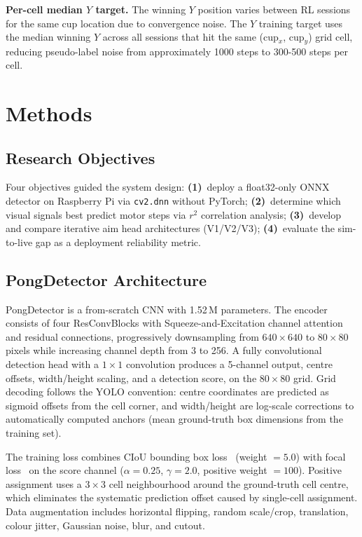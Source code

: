 \documentclass[conference]{IEEEtran}
\begin{document}
\textbf{Per-cell median $Y$ target.}  The winning $Y$ position varies between
RL sessions for the same cup location due to convergence noise.  The $Y$
training target uses the median winning $Y$ across all sessions that hit the
same (cup$_x$, cup$_y$) grid cell, reducing pseudo-label noise from
approximately 1000 steps to 300-500 steps per cell.

\section{Methods}
\label{sec:methods}

\subsection{Research Objectives}

Four objectives guided the system design: \textbf{(1)}~deploy a float32-only
ONNX detector on Raspberry Pi via \texttt{cv2.dnn} without PyTorch;
\textbf{(2)}~determine which visual signals best predict motor steps via $r^{2}$
correlation analysis; \textbf{(3)}~develop and compare iterative aim head
architectures (V1/V2/V3); \textbf{(4)}~evaluate the sim-to-live gap as a
deployment reliability metric.

\subsection{PongDetector Architecture}

PongDetector is a from-scratch CNN with 1.52\,M parameters.  The encoder
consists of four ResConvBlocks with Squeeze-and-Excitation channel attention
and residual connections, progressively downsampling from $640{\times}640$ to
$80{\times}80$ pixels while increasing channel depth from 3 to 256.  A fully
convolutional detection head with a $1{\times}1$ convolution produces a
5-channel output, centre offsets, width/height scaling, and a detection score,
on the $80{\times}80$ grid.  Grid decoding follows the YOLO convention: centre
coordinates are predicted as sigmoid offsets from the cell corner, and
width/height are log-scale corrections to automatically computed anchors (mean
ground-truth box dimensions from the training set).

The training loss combines CIoU bounding box loss~\cite{zheng2020} (weight
$=5.0$) with focal loss~\cite{lin2017} on the score channel ($\alpha=0.25$,
$\gamma=2.0$, positive weight $=100$).  Positive assignment uses a $3{\times}3$
cell neighbourhood around the ground-truth cell centre, which eliminates the
systematic prediction offset caused by single-cell assignment.  Data
augmentation includes horizontal flipping, random scale/crop, translation,
colour jitter, Gaussian noise, blur, and cutout.
\end{document}
